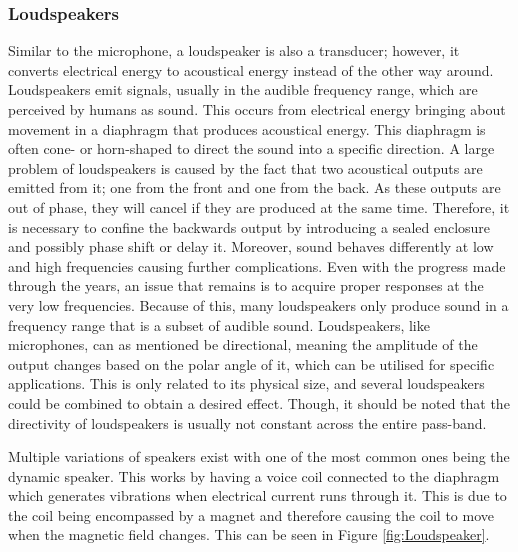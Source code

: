 \subsubsection{Loudspeakers}\label{subsubsec:Loudspeakers}

Similar to the microphone, a loudspeaker is also a transducer; however, it converts electrical energy to acoustical energy instead of the other way around. Loudspeakers emit signals, usually in the audible frequency range, which are perceived by humans as sound. This occurs from electrical energy bringing about movement in a diaphragm that produces acoustical energy. This diaphragm is often cone- or horn-shaped to direct the sound into a specific direction. A large problem of loudspeakers is caused by the fact that two acoustical outputs are emitted from it; one from the front and one from the back. As these outputs are out of phase, they will cancel if they are produced at the same time. Therefore, it is necessary to confine the backwards output by introducing a sealed enclosure and possibly phase shift or delay it. Moreover, sound behaves differently at low and high frequencies causing further complications. Even with the progress made through the years, an issue that remains is to acquire proper responses at the very low frequencies. Because of this, many loudspeakers only produce sound in a frequency range that is a subset of audible sound. Loudspeakers, like microphones, can as mentioned be directional, meaning the amplitude of the output changes based on the polar angle of it, which can be utilised for specific applications. This is only related to its physical size, and several loudspeakers could be combined to obtain a desired effect. Though, it should be noted that the directivity of loudspeakers is usually not constant across the entire pass-band. \cite{Acoustics:Handbook_of_Acoustics}

Multiple variations of speakers exist with one of the most common ones being the dynamic speaker. This works by having a voice coil connected to the diaphragm which generates vibrations when electrical current runs through it. This is due to the coil being encompassed by a magnet and therefore causing the coil to move when the magnetic field changes. This can be seen in Figure \ref{fig:Loudspeaker}. \cite{Acoustics:Audio_production}

